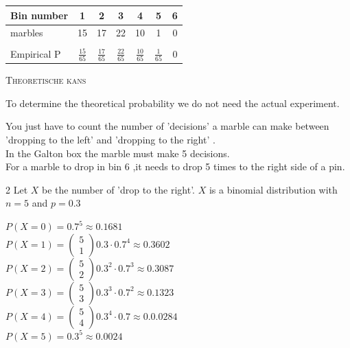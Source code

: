 \documentclass[dutch,12 pt,english]{article}
\newcommand{\noun}[1]{\textsc{#1}}
\begin{document}
\begin{flushleft}
\indent

\begin{tabular}{|l c c c c c c |}
    \hline
    Bin number  & 1 & 2 & 3 & 4 & 5 & 6\tabularnewline
    \hline
    marbles  & 15 & 17 & 22 & 10 & 1 & 0\tabularnewline
    \hline
     & & & & & &  \tabularnewline
    Empirical P & $\frac{15}{65}$&$\frac{17}{65}$ &$\frac{22}{65}$ & $\frac{10}{65}$&$\frac{1}{65}$ & 0   \tabularnewline
    \hline
\end{tabular}

\newpage

\noun{Theoretische kans }

\indent

To determine the theoretical probability we do not need the actual experiment.

You just have to count the number of 'decisions' a marble can make between 'dropping to the left' and
'dropping to the right' .\\
In the Galton box the marble must make 5 decisions.\\
For a marble to drop in bin 6 ,it needs to drop 5 times to the right side of a pin.

\indent

\begin{multicols}{2}
Let $ X $ be the number of 'drop to the right'.
$ X $ is a binomial distribution with $ n = 5 $ and $ p = 0.3 $

$P(X=0)=0.7^5 \approx 0.1681$\\
$P(X=1)=\left( \begin{array}{c}5 \\ 1 \end{array} \right) 0.3 \cdot 0.7^4 \approx 0.3602$\\
$P(X=2)=\left( \begin{array}{c}5 \\ 2 \end{array} \right) 0.3^2 \cdot 0.7^3 \approx 0.3087$\\
$P(X=3)=\left( \begin{array}{c}5 \\ 3 \end{array} \right) 0.3^3 \cdot 0.7^2 \approx 0.1323$\\
$P(X=4)=\left( \begin{array}{c}5 \\ 4 \end{array} \right) 0.3^4 \cdot 0.7 \approx 0.0.0284$\\
$P(X=5)=0.3^5 \approx 0.0024$


\end{multicols}
\end{flushleft}
\end{document}
